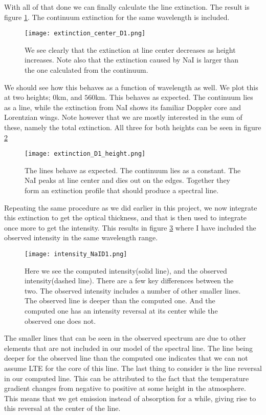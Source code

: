 \documentclass{aa}   %
\begin{document}
With all of that done we can finally calculate the line extinction. The result is figure \ref{extinction_center_D1}. The continuum extinction for the same wavelength is included.
\begin{figure}
 \texttt{[image: extinction\_center\_D1.png]}
 \caption{We see clearly that the extinction at line center decreases as height increases. Note also that the extinction caused by NaI is larger than the one calculated from the continuum.}
\label{extinction_center_D1}
\end{figure}
We should see how this behaves as a function of wavelength as well. We plot this at two heights; $0$km, and $560$km. This behaves as expected. The continuum lies as a line, while the extinction from NaI shows its familiar Doppler core and Lorentzian wings.
Note however that we are mostly interested in the sum of these, namely the total extinction. All three for both heights can be seen in figure \ref{extinction_D1_height}
\begin{figure}
 \texttt{[image: extinction\_D1\_height.png]}
 \caption{The lines behave as expected. The continuum lies as a constant. The NaI peaks at line center and dies out on the edges. Together they form an extinction profile that should produce a spectral line.}
\label{extinction_D1_height}
\end{figure}
Repeating the same procedure as we did earlier in this project, we now integrate this extinction to get the optical thickness, and that is then used to integrate once more to get the intensity. This results in figure \ref{intensity_NaID1} where I have included the observed intensity in the same wavelength range.
\begin{figure}
 \texttt{[image: intensity\_NaID1.png]}
 \caption{Here we see the computed intensity(solid line), and the observed intensity(dashed line). There are a few key differences between the two. The observed intensity includes a number of other smaller lines. The observed line is deeper than the computed one. And the computed one has an intensity reversal at its center while the observed one does not.}
\label{intensity_NaID1}
\end{figure}
The smaller lines that can be seen in the observed spectrum are due to other elements that are not included in our model of the spectral line. The line being deeper for the observed line than the computed one indicates that we can not assume LTE for the core of this line. The last thing to consider is the line reversal in our computed line. This can be attributed to the fact that the temperature gradient changes from negative to positive at some height in the atmosphere. This means that we get emission instead of absorption for a while, giving rise to this reversal at the center of the line. 
\end{document}
